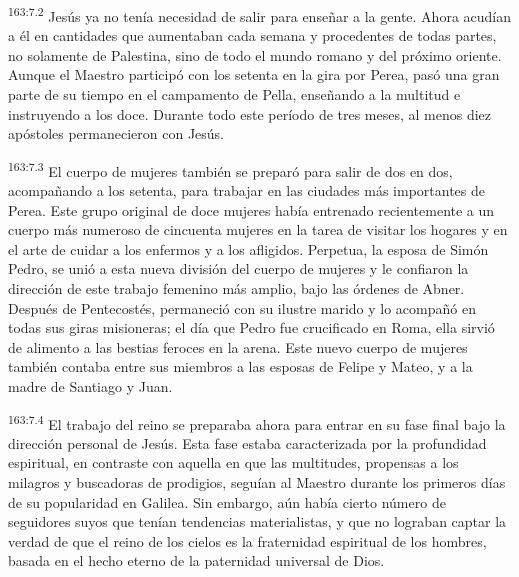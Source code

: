 \par
\textsuperscript{163:7.2} Jesús ya no tenía necesidad de salir para enseñar a la gente. Ahora acudían a él en cantidades que aumentaban cada semana y procedentes de todas partes, no solamente de Palestina, sino de todo el mundo romano y del próximo oriente. Aunque el Maestro participó con los setenta en la gira por Perea, pasó una gran parte de su tiempo en el campamento de Pella, enseñando a la multitud e instruyendo a los doce. Durante todo este período de tres meses, al menos diez apóstoles permanecieron con Jesús.

\par
\textsuperscript{163:7.3} El cuerpo de mujeres también se preparó para salir de dos en dos, acompañando a los setenta, para trabajar en las ciudades más importantes de Perea. Este grupo original de doce mujeres había entrenado recientemente a un cuerpo más numeroso de cincuenta mujeres en la tarea de visitar los hogares y en el arte de cuidar a los enfermos y a los afligidos. Perpetua, la esposa de Simón Pedro, se unió a esta nueva división del cuerpo de mujeres y le confiaron la dirección de este trabajo femenino más amplio, bajo las órdenes de Abner. Después de Pentecostés, permaneció con su ilustre marido y lo acompañó en todas sus giras misioneras; el día que Pedro fue crucificado en Roma, ella sirvió de alimento a las bestias feroces en la arena. Este nuevo cuerpo de mujeres también contaba entre sus miembros a las esposas de Felipe y Mateo, y a la madre de Santiago y Juan.

\par
\textsuperscript{163:7.4} El trabajo del reino se preparaba ahora para entrar en su fase final bajo la dirección personal de Jesús. Esta fase estaba caracterizada por la profundidad espiritual, en contraste con aquella en que las multitudes, propensas a los milagros y buscadoras de prodigios, seguían al Maestro durante los primeros días de su popularidad en Galilea. Sin embargo, aún había cierto número de seguidores suyos que tenían tendencias materialistas, y que no lograban captar la verdad de que el reino de los cielos es la fraternidad espiritual de los hombres, basada en el hecho eterno de la paternidad universal de Dios.